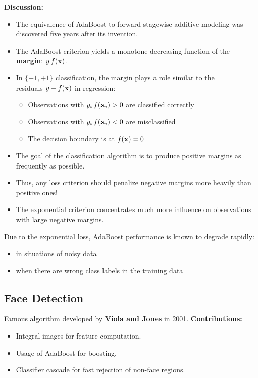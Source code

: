  
 \textbf {Discussion:}

  \begin{itemize}
    \item The equivalence of AdaBoost to forward stagewise additive modeling was discovered five years after its invention. %
    \item The AdaBoost criterion yields a monotone decreasing function of the \textbf        {margin}: $y\,f(\bm{\mathrm{x}})$.          %
    \item In $\{-1, +1\}$ classification, the margin plays a role similar to the \\
      residuals $y - f(\bm{\mathrm{x}})$ in regression:
      \begin{itemize}
        \item Observations with $y_i \, f(\bm{\mathrm{x}}_i) > 0$ are classified correctly
        \item Observations with $y_i \, f(\bm{\mathrm{x}}_i) < 0$ are misclassified 
        \item The decision boundary is at $f(\bm{\mathrm{x}}) = 0$
     \end{itemize}
   \item The goal of the classification algorithm is to produce positive margins as frequently as possible. %
    \item Thus, any loss criterion should penalize negative margins more heavily than positive ones! %
    \item The exponential criterion concentrates much more influence on observations with large negative margins.
  \end{itemize}
 
  Due to the exponential loss, AdaBoost performance is known to degrade rapidly:
  \begin{itemize}
    \item in situations of noisy data
    \item when there are wrong class labels in the training data
  \end{itemize}
 
\subsection{Face Detection}

  Famous algorithm developed by \textbf {Viola and Jones} in 2001.
 \textbf{Contributions:}

  \begin{itemize}
    \item Integral images for feature computation.
    \item Usage of AdaBoost for boosting.
    \item Classifier cascade for fast rejection of non-face regions.
  \end{itemize}

